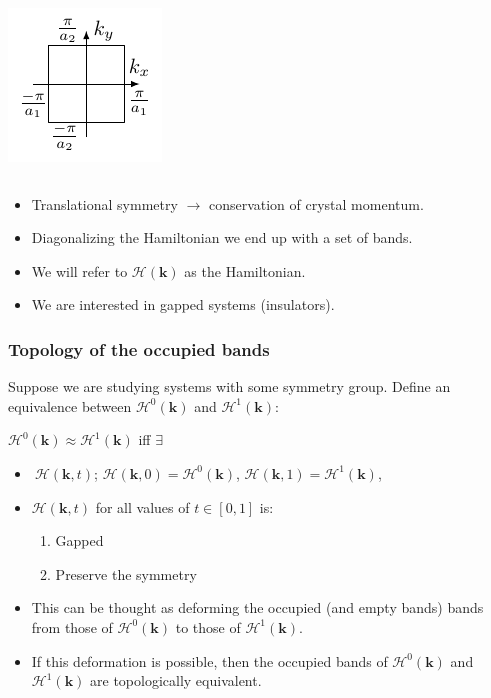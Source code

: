\documentclass{beamer}
\newcommand{\mc}{\mathcal}
\renewcommand{\(}{\left(}
\renewcommand{\)}{\right)}
\renewcommand{\[}{\left[}
\renewcommand{\]}{\right]}
\begin{document}
\begin{frame}
\begin{columns}
        \begin{column}{0.3\textwidth}
            \centering
            \includegraphics[]{square_recep_lattice.pdf}
            \vfill
        \end{column}
    \end{columns}
    \begin{itemize}
        \item Translational symmetry $\rightarrow$ conservation of crystal momentum.
        \item Diagonalizing the Hamiltonian we end up with a set of bands. 
        \item We will refer to $\mc H(\bm k)$ as the Hamiltonian.
        \item We are interested in gapped systems (insulators).
    \end{itemize}
\end{frame}

\begin{frame}
    \frametitle{Topology of the occupied bands}
    Suppose we are studying systems with some symmetry group. Define an equivalence between $\mc H^0(\bm k)$ and $\mc H^1(\bm k)$:
    \begin{framed}
        \begin{center}
            $\mc H^0(\bm k) \approx \mc H^1(\bm k)$ iff $\exists$
        \end{center}
        \begin{itemize}
            \item $\ \mc H(\bm k, t)$;  $\mc H(\bm k,0) = \mc H^0(\bm k)$, $\mc H(\bm k,1) = \mc H^1(\bm k)$, 
            \item $\mc H(\bm k,t)$ for all values of $t \in [0,1]$ is: 
            \begin{enumerate}
                \item Gapped
                \item Preserve the symmetry
            \end{enumerate}
        \end{itemize}
    \end{framed}  \pause
    \begin{itemize}
        \item This can be thought as deforming the occupied (and empty bands) bands from those of $\mc H^0(\bm k)$ to those of $\mc H^1(\bm k)$. 
        \item If this deformation is possible, then the occupied bands of $\mc H^0(\bm k)$ and $\mc H^1(\bm k)$ are topologically equivalent.
    \end{itemize}
\end{frame}
\end{document}
